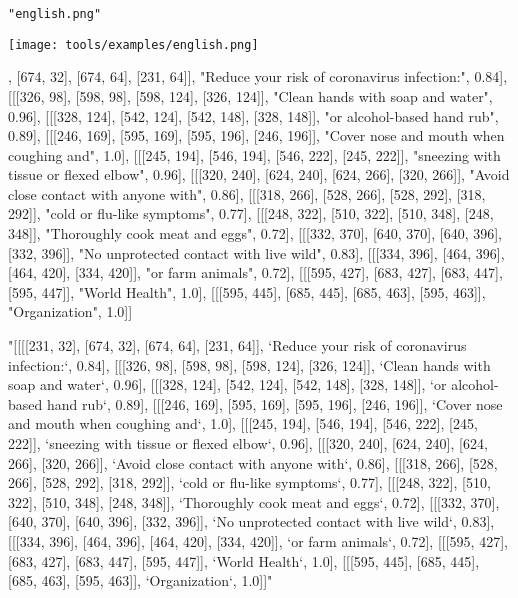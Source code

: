 \begin{textcolorbox}
 \texttt{"english.png"}

\vspace{0.2cm}
\texttt{[image: tools/examples/english.png]}
\vspace{0.2cm}

{\footnotesize
\begin{codebox}
[[[[231, 32], [674, 32], [674, 64], [231, 64]], "Reduce your risk of coronavirus infection:", 0.84], 
[[[326, 98], [598, 98], [598, 124], [326, 124]], "Clean hands with soap and water", 0.96], 
[[[328, 124], [542, 124], [542, 148], [328, 148]], "or alcohol-based hand rub", 0.89], 
[[[246, 169], [595, 169], [595, 196], [246, 196]], "Cover nose and mouth when coughing and", 1.0], 
[[[245, 194], [546, 194], [546, 222], [245, 222]], "sneezing with tissue or flexed elbow", 0.96], 
[[[320, 240], [624, 240], [624, 266], [320, 266]], "Avoid close contact with anyone with", 0.86], 
[[[318, 266], [528, 266], [528, 292], [318, 292]], "cold or flu-like symptoms", 0.77], 
[[[248, 322], [510, 322], [510, 348], [248, 348]], "Thoroughly cook meat and eggs", 0.72], 
[[[332, 370], [640, 370], [640, 396], [332, 396]], "No unprotected contact with live wild", 0.83], 
[[[334, 396], [464, 396], [464, 420], [334, 420]], "or farm animals", 0.72],
[[[595, 427], [683, 427], [683, 447], [595, 447]], "World Health", 1.0], 
[[[595, 445], [685, 445], [685, 463], [595, 463]], "Organization", 1.0]]
\end{codebox}
}
{\footnotesize
\begin{codebox}
{
    "[[[[231, 32], [674, 32], [674, 64], [231, 64]], `Reduce your risk of coronavirus infection:`, 0.84], [[[326, 98], [598, 98], [598, 124], [326, 124]], `Clean hands with soap and water`, 0.96], [[[328, 124], [542, 124], [542, 148], [328, 148]], `or alcohol-based hand rub`, 0.89], [[[246, 169], [595, 169], [595, 196], [246, 196]], `Cover nose and mouth when coughing and`, 1.0], [[[245, 194], [546, 194], [546, 222], [245, 222]], `sneezing with tissue or flexed elbow`, 0.96], [[[320, 240], [624, 240], [624, 266], [320, 266]], `Avoid close contact with anyone with`, 0.86], [[[318, 266], [528, 266], [528, 292], [318, 292]], `cold or flu-like symptoms`, 0.77], [[[248, 322], [510, 322], [510, 348], [248, 348]], `Thoroughly cook meat and eggs`, 0.72], [[[332, 370], [640, 370], [640, 396], [332, 396]], `No unprotected contact with live wild`, 0.83], [[[334, 396], [464, 396], [464, 420], [334, 420]], `or farm animals`, 0.72], [[[595, 427], [683, 427], [683, 447], [595, 447]], `World Health`, 1.0], [[[595, 445], [685, 445], [685, 463], [595, 463]], `Organization`, 1.0]]"
}
\end{codebox}
}

\end{textcolorbox}

